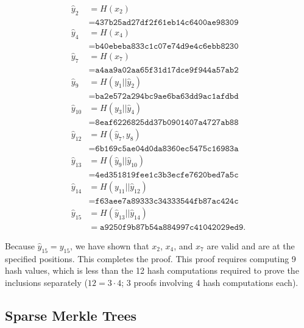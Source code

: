 \begin{example}
\begin{align}
    \hat{y}_{2} &= H(x_{2}) \nonumber\\
        &= \texttt{437b25ad27df2f61eb14c6400ae98309}
            \nonumber\\
    \hat{y}_{4} &= H(x_{4}) \nonumber\\
        &= \texttt{b40ebeba833c1c07e74d9e4c6ebb8230}
            \nonumber\\
    \hat{y}_{7} &= H(x_{7}) \nonumber\\
        &= \texttt{a4aa9a02aa65f31d17dce9f944a57ab2}
            \nonumber\\
    \hat{y}_{9} &= H(y_{1}||\hat{y}_{2}) \nonumber\\
        &= \texttt{ba2e572a294bc9ae6ba63dd9ac1afdbd}
            \nonumber\\
    \hat{y}_{10} &= H(y_{3}||\hat{y}_{4}) \nonumber\\
        &= \texttt{8eaf6226825dd37b0901407a4727ab88}
            \nonumber\\
    \hat{y}_{12} &= H(\hat{y}_{7},y_{8}) \nonumber\\
        &= \texttt{6b169c5ae04d0da8360ec5475c16983a}
            \nonumber\\
    \hat{y}_{13} &= H(\hat{y}_{9}||\hat{y}_{10}) \nonumber\\
        &= \texttt{4ed351819fee1c3b3ecfe7620bed7a5c}
            \nonumber\\
    \hat{y}_{14} &= H(y_{11}||\hat{y}_{12}) \nonumber\\
        &= \texttt{f63aee7a89333c34333544fb87ac424c}
            \nonumber\\
    \hat{y}_{15} &= H(\hat{y}_{13}||\hat{y}_{14}) \nonumber\\
        &= \texttt{a9250f9b87b54a884997c41042029ed9}.
\end{align}

\noindent
Because $\hat{y}_{15} = y_{15}$, we have shown that
$x_{2}$, $x_{4}$, and $x_{7}$ are valid and are at the specified positions.
This completes the proof.
This proof requires computing 9 hash values,
which is less than the 12 hash computations required to prove the inclusions
separately ($12 = 3\cdot 4$; 3 proofs involving 4 hash computations each).
\end{example}

\subsection{Sparse Merkle Trees}

